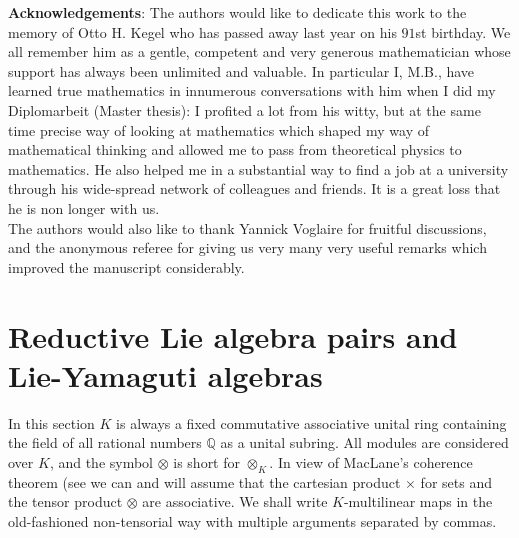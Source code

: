 \documentclass [11pt] {article}
\theoremstyle{definition}
\begin{document}
\noindent \textbf{Acknowledgements}:
The authors would like to dedicate this work to the memory of Otto H. Kegel who
has passed away last year on his $91$st birthday. We all remember him as a gentle,
competent and very generous mathematician whose support has always been unlimited and %
valuable. In particular I, M.B., have learned true mathematics in innumerous conversations with him when I did my Diplomarbeit (Master thesis):
I profited a lot from his witty, but at the same time %
precise way of looking at mathematics which shaped my way of mathematical thinking and allowed me to pass from theoretical physics to mathematics. He also helped me in a substantial way to find a job at a university through his wide-spread network
of colleagues and friends. It is a great loss that he is non longer with us.
\\
The authors would also like to thank Yannick Voglaire for fruitful discussions,
and the anonymous referee for giving us very many very useful remarks which
improved the manuscript considerably.












\section{Reductive Lie algebra pairs and Lie-Yamaguti algebras}

 In this section $K$ is always a 
fixed
commutative associative unital ring containing the field of all 
rational numbers $\mathbb{Q}$ as a unital subring. All modules
are considered over $K$, and the symbol $\otimes$ is short for $\otimes_K$.
In view of MacLane's coherence theorem (see \cite[p.~165--170]{Mac98}
we can and will assume that the cartesian product $\times$ for sets and the tensor product $\otimes$ are associative. We shall write
$K$-multilinear maps in the old-fashioned non-tensorial
way with multiple arguments separated by commas.
\end{document}
